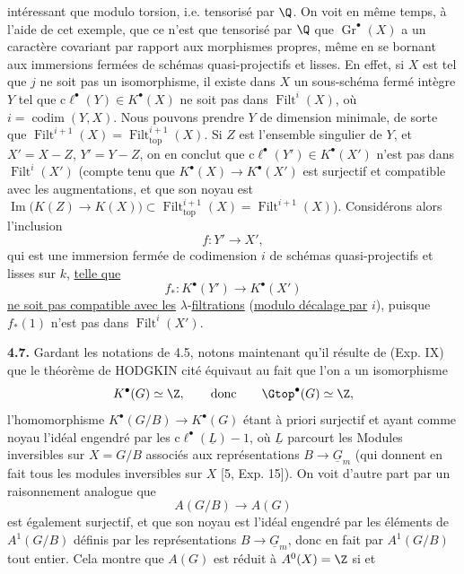 
intéressant que modulo torsion, i.e. tensorisé par $\Q$. On voit en même temps, à l'aide de cet exemple, que ce n'est que tensorisé par $\Q$ que $\operatorname{Gr}^\bullet(X)$ a un caractère covariant par rapport aux morphismes propres, même en se bornant aux immersions fermées de schémas quasi-projectifs et lisses. En effet, si $X$ est tel que $j$ ne soit pas un isomorphisme, il existe dans $X$ un sous-schéma fermé intègre $Y$ tel que $\mathrm{c}\ell^\bullet(Y)\in K^\bullet(X)$ ne soit pas dans $\operatorname{Filt}^i(X)$, où $i=\operatorname{codim}(Y,X)$. Nous pouvons prendre $Y$ de dimension minimale, de sorte que $\operatorname{Filt}^{i+1}(X)=\operatorname{Filt}_{\mathrm{top}}^{i+1}(X)$. Si $Z$ est l'ensemble singulier de $Y$, et $X'=X-Z$, $Y'=Y-Z$, on en conclut que $\mathrm{c}\ell^\bullet(Y')\in K^\bullet(X')$ n'est pas dans $\operatorname{Filt}^i(X')$ (compte tenu que $K^\bullet(X)\to K^\bullet(X')$ est surjectif et compatible avec les augmentations, et que son noyau est $\operatorname{Im}\bigl(K(Z)\longrightarrow K(X)\bigr)\subset\operatorname{Filt}_{\mathrm{top}}^{i+1}(X)=\operatorname{Filt}^{i+1}(X)$). Considérons alors l'inclusion
\[
 f:Y'\longrightarrow X',
\]
qui est une immersion fermée de codimension $i$ de schémas quasi-projectifs et lisses sur $k$, \uline{telle que}
\[
 f_*:K^\bullet(Y')\longrightarrow K^\bullet(X')
\]
\uline{ne soit pas compatible avec les} $\lambda$-\uline{filtrations} (\uline{modulo décalage par} $i$), puisque $f_*(1)$ n'est pas dans $\operatorname{Filt}^i(X')$.

\textbf{4.7.} Gardant les notations de 4.5, notons maintenant qu'il résulte de (Exp. IX) que le théorème de HODGKIN cité équivaut au fait que l'on a un isomorphisme
\[
 K^\bullet(G)\simeq\Z,\qquad\text{donc}\qquad \Gtop^\bullet(G)\simeq\Z,
\]
l'homomorphisme $K^\bullet(G/B)\to K^\bullet(G)$ étant à priori surjectif et ayant comme noyau l'idéal engendré par les $\mathrm{c}\ell^\bullet(\underline{L})-1$, où $\underline{L}$ parcourt les Modules inversibles sur $X=G/B$ associés aux représentations $B\to\underline{G}_m$ (qui donnent en fait tous les modules inversibles sur $X$ [5, Exp. 15]). On voit d'autre part par un raisonnement analogue que
\[
 A(G/B)\longrightarrow A(G)
\]
est également surjectif, et que son noyau est l'idéal engendré par les éléments de $A^1(G/B)$ définis par les représentations $B\to\underline{G}_m$, donc en fait par $A^1(G/B)$ tout entier. Cela montre que $A(G)$ est réduit à $A^0(X)=\Z$ si et
